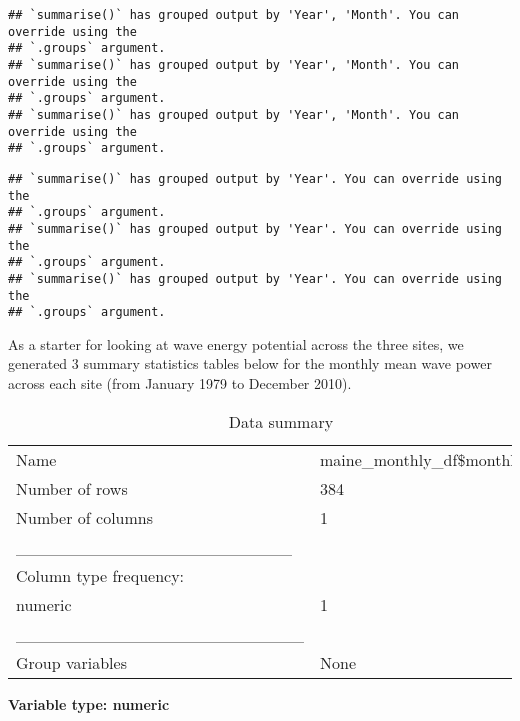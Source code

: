 \documentclass[
]{article}
\begin{document}
\begin{verbatim}
## `summarise()` has grouped output by 'Year', 'Month'. You can override using the
## `.groups` argument.
## `summarise()` has grouped output by 'Year', 'Month'. You can override using the
## `.groups` argument.
## `summarise()` has grouped output by 'Year', 'Month'. You can override using the
## `.groups` argument.
\end{verbatim}

\begin{verbatim}
## `summarise()` has grouped output by 'Year'. You can override using the
## `.groups` argument.
## `summarise()` has grouped output by 'Year'. You can override using the
## `.groups` argument.
## `summarise()` has grouped output by 'Year'. You can override using the
## `.groups` argument.
\end{verbatim}

As a starter for looking at wave energy potential across the three
sites, we generated 3 summary statistics tables below for the monthly
mean wave power across each site (from January 1979 to December 2010).

\begin{longtable}[]{@{}ll@{}}
\caption{Data summary}\tabularnewline
\toprule\noalign{}
\endfirsthead
\endhead
\bottomrule\noalign{}
\endlastfoot
Name & maine\_monthly\_df\$monthly\_\ldots{} \\
Number of rows & 384 \\
Number of columns & 1 \\
\_\_\_\_\_\_\_\_\_\_\_\_\_\_\_\_\_\_\_\_\_\_\_ & \\
Column type frequency: & \\
numeric & 1 \\
\_\_\_\_\_\_\_\_\_\_\_\_\_\_\_\_\_\_\_\_\_\_\_\_ & \\
Group variables & None \\
\end{longtable}

\textbf{Variable type: numeric}
\end{document}
